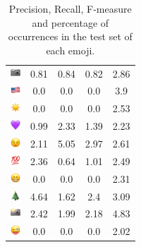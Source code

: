 \documentclass{article}
\begin{document}
\begin{table}
\begin{tabular}{|c|ccc|c|}
\includegraphics[height=0.37cm,width=0.37cm]{img/camera.png} & 0.81 & 0.84 & 0.82 & 2.86\\ 
\includegraphics[height=0.37cm,width=0.37cm]{img/United_States.png} & 0.0 & 0.0 & 0.0 & 3.9\\ 
\includegraphics[height=0.37cm,width=0.37cm]{img/sun.png} & 0.0 & 0.0 & 0.0 & 2.53\\ 
\includegraphics[height=0.37cm,width=0.37cm]{img/purple_heart.png} & 0.99 & 2.33 & 1.39 & 2.23\\ 
\includegraphics[height=0.37cm,width=0.37cm]{img/winking_face.png} & 2.11 & 5.05 & 2.97 & 2.61\\ 
\includegraphics[height=0.37cm,width=0.37cm]{img/hundred_points.png} & 2.36 & 0.64 & 1.01 & 2.49\\ 
\includegraphics[height=0.37cm,width=0.37cm]{img/beaming_face_with_smiling_eyes.png} & 0.0 & 0.0 & 0.0 & 2.31\\ 
\includegraphics[height=0.37cm,width=0.37cm]{img/Christmas_tree.png} & 4.64 & 1.62 & 2.4 & 3.09\\ 
\includegraphics[height=0.37cm,width=0.37cm]{img/camera_with_flash.png} & 2.42 & 1.99 & 2.18 & 4.83\\ 
\includegraphics[height=0.37cm,width=0.37cm]{img/winking_face_with_tongue.png} & 0.0 & 0.0 & 0.0 & 2.02\\ 

\hline
\end{tabular}
\caption{\label{table:emoji_detailed} Precision, Recall, F-measure and percentage of occurrences in the test set of each emoji.}
\end{table}
\end{document}
